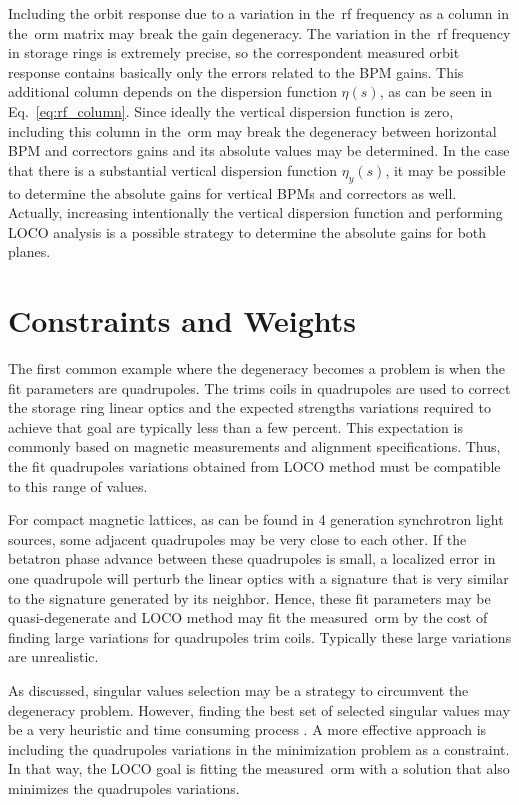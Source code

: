 Including the orbit response due to a variation in the~\gls{rf} frequency as a column in the~\gls{orm} matrix may break the gain degeneracy. The variation in the~\gls{rf} frequency in storage rings is extremely precise, so the correspondent measured orbit response contains basically only the errors related to the BPM gains. This additional column depends on the dispersion function $\eta(s)$, as can be seen in Eq.~\eqref{eq:rf_column}. Since ideally the vertical dispersion function is zero, including this column in the~\gls{orm} may break the degeneracy between horizontal BPM and correctors gains and its absolute values may be determined. In the case that there is a substantial vertical dispersion function $\eta_y(s)$, it may be possible to determine the absolute gains for vertical BPMs and correctors as well. Actually, increasing intentionally the vertical dispersion function and performing LOCO analysis is a possible strategy to determine the absolute gains for both planes.
\section{Constraints and Weights}\label{sec:constraint}
The first common example where the degeneracy becomes a problem is when the fit parameters are quadrupoles. The trims coils in quadrupoles are used to correct the storage ring linear optics and the expected strengths variations required to achieve that goal are typically less than a few percent. This expectation is commonly based on magnetic measurements and alignment specifications. Thus, the fit quadrupoles variations obtained from LOCO method must be compatible to this range of values. 

For compact magnetic lattices, as can be found in 4 generation synchrotron light sources, some adjacent quadrupoles may be very close to each other. If the betatron phase advance between these quadrupoles is small, a localized error in one quadrupole will perturb the linear optics with a signature that is very similar to the signature generated by its neighbor. Hence, these fit parameters may be quasi-degenerate and LOCO method may fit the measured~\gls{orm} by the cost of finding large variations for quadrupoles trim coils. Typically these large variations are unrealistic.

As discussed, singular values selection may be a strategy to circumvent the degeneracy problem. However, finding the best set of selected singular values may be a very heuristic and time consuming process \cite{icfa_laurent}. A more effective approach is including the quadrupoles variations in the minimization problem as a constraint. In that way, the LOCO goal is fitting the measured~\gls{orm} with a solution that also minimizes the quadrupoles variations. 

